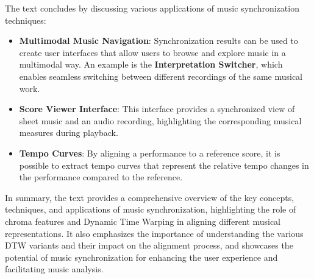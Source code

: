 \documentclass[a4paper, 9pt, twocolumn]{extarticle}
\begin{document}
    The text concludes by discussing various applications of music
    synchronization techniques:
    
    \begin{itemize}
    \item
      \textbf{Multimodal Music Navigation}: Synchronization results can be
      used to create user interfaces that allow users to browse and explore
      music in a multimodal way. An example is the \textbf{Interpretation
      Switcher}, which enables seamless switching between different
      recordings of the same musical work.
    \item
      \textbf{Score Viewer Interface}: This interface provides a
      synchronized view of sheet music and an audio recording, highlighting
      the corresponding musical measures during playback.
    \item
      \textbf{Tempo Curves}: By aligning a performance to a reference score,
      it is possible to extract tempo curves that represent the relative
      tempo changes in the performance compared to the reference.
    \end{itemize}
    
    In summary, the text provides a comprehensive overview of the key
    concepts, techniques, and applications of music synchronization,
    highlighting the role of chroma features and Dynamic Time Warping in
    aligning different musical representations. It also emphasizes the
    importance of understanding the various DTW variants and their impact on
    the alignment process, and showcases the potential of music
    synchronization for enhancing the user experience and facilitating music
    analysis.
    
\end{document}
